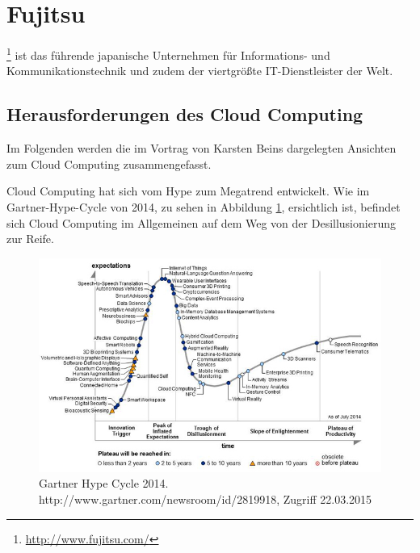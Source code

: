 \section{Fujitsu}
\label{sec_fujitsu}

%

\footnote{\url{http://www.fujitsu.com/}} ist das führende japanische Unternehmen für Informations- und Kommunikationstechnik und zudem der viertgrößte IT-Dienstleister der Welt. 

\subsection{Herausforderungen des Cloud Computing}
\label{sec_fujitsu_general}


Im Folgenden werden die im Vortrag von Karsten Beins\cite{vortragFujitsu} dargelegten Ansichten zum Cloud Computing zusammengefasst.

Cloud Computing hat sich vom Hype zum Megatrend entwickelt. 
Wie im Gartner-Hype-Cycle von 2014, zu sehen in Abbildung \ref{fig:gartnerHypeCycle2014}, ersichtlich ist, befindet sich Cloud Computing im Allgemeinen auf dem Weg von der Desillusionierung zur Reife. 

\begin{figure}
	\centering
	\includegraphics[width=0.8\linewidth]{images/gartnerHypeCycle2014}
	\caption{Gartner Hype Cycle 2014. http://www.gartner.com/newsroom/id/2819918, Zugriff 22.03.2015}
	\label{fig:gartnerHypeCycle2014}
\end{figure}

